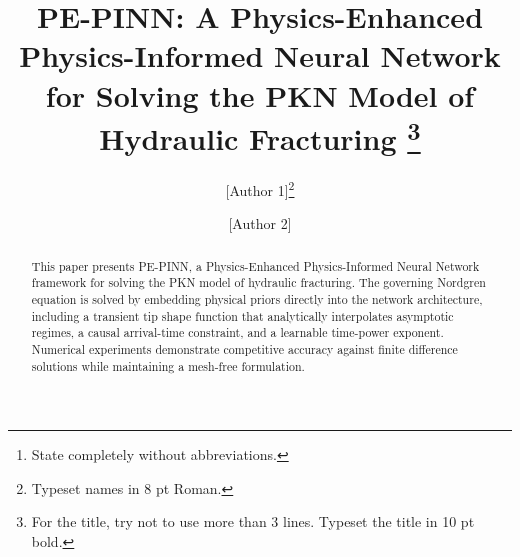 \documentclass{ws-ijcm}
\begin{document}
%
\catchline{}{}{}{}{}
%


\title{PE-PINN: A Physics-Enhanced Physics-Informed Neural Network \\
for Solving the PKN Model of Hydraulic Fracturing%
\footnote{For the title, try not to use more than 3 lines. Typeset the title in 10 pt bold.}
}

\author{[Author 1]\footnote{Typeset names in 8 pt Roman.}}

\address{[Department, University]\\
[City, Country]\,\footnote{State completely without abbreviations.}\\
\email{[email]}}

\author{[Author 2]}

\address{[Department, University]\\
[City, Country]\\
\email{[email]}}

\maketitle

\begin{history}
\end{history}

\begin{abstract}
This paper presents PE-PINN, a Physics-Enhanced Physics-Informed Neural
Network framework for solving the PKN model of hydraulic fracturing.
The governing Nordgren equation is solved by embedding physical priors
directly into the network architecture, including a transient tip shape
function that analytically interpolates asymptotic regimes, a causal
arrival-time constraint, and a learnable time-power exponent. Numerical
experiments demonstrate competitive accuracy against finite difference
solutions while maintaining a mesh-free formulation.
\end{abstract}

\end{document}
